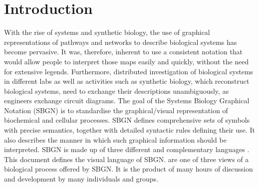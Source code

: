 

\chapter{Introduction}

With the rise of systems and synthetic biology, the use of graphical representations
of pathways and networks to describe biological systems has become pervasive. 
It was, therefore, inherent to use a consistent notation that would allow people 
to interpret those maps easily and quickly, without the need for extensive legends.
Furthermore, distributed investigation of biological systems in different labs as well
as activities such as synthetic biology, which reconstruct biological systems, need
to exchange their descriptions unambiguously, as engineers exchange circuit diagrams.
The goal of the Systems Biology Graphical Notation (SBGN) is to standardise the 
graphical/visual representation of biochemical and cellular processes. SBGN 
defines comprehensive sets of symbols with precise semantics, together with 
detailed syntactic rules defining their use. It also describes the manner 
in which such graphical information should be interpreted.
SBGN is made up of three different and complementary languages \cite{Novere:2009p1}.
This document defines the \emph{\PD{}} visual language of SBGN. \PDs are 
one of three views of a biological process offered by SBGN. It is the 
product of many hours of discussion and development by many individuals and 
groups.

